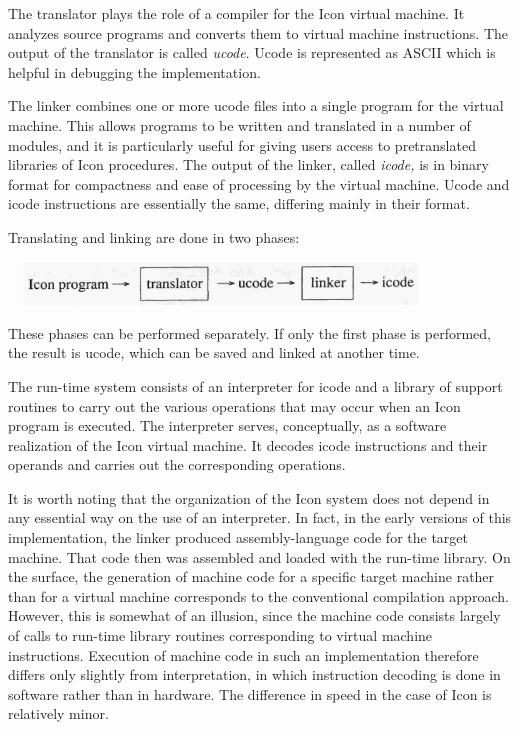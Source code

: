 The translator plays the role of a compiler for the Icon virtual
machine. It analyzes source programs and converts them to virtual
machine instructions. The output of the translator is called
\textit{ucode}. Ucode is represented as ASCII which is helpful in
debugging the implementation.

The linker combines one or more ucode files into a single program for
the virtual machine. This allows programs to be written and translated
in a number of modules, and it is particularly useful for giving users
access to pretranslated libraries of Icon procedures. The output of
the linker, called \textit{icode, }is in binary format for compactness
and ease of processing by the virtual machine. Ucode and icode
instructions are essentially the same, differing mainly in their
format.

Translating and linking are done in two phases:

\ \  \includegraphics[width=4.1681in,height=0.4543in]{ib-img/ib-img004.jpg} 


These phases can be performed separately. If only the first phase is
performed, the result is ucode, which can be saved and linked at
another time.

The run-time system consists of an interpreter for icode and a library
of support routines to carry out the various operations that may occur
when an Icon program is executed. The interpreter serves,
conceptually, as a software realization of the Icon virtual
machine. It decodes icode instructions and their operands and carries
out the corresponding operations.

It is worth noting that the organization of the Icon system does not
depend in any essential way on the use of an interpreter. In fact, in
the early versions of this implementation, the linker produced
assembly-language code for the target machine. That code then was
assembled and loaded with the run-time library. On the surface, the
generation of machine code for a specific target machine rather than
for a virtual machine corresponds to the conventional compilation
approach. However, this is somewhat of an illusion, since the machine
code consists largely of calls to run-time library routines
corresponding to virtual machine instructions. Execution of machine
code in such an implementation therefore differs only slightly from
interpretation, in which instruction decoding is done in software
rather than in hardware. The difference in speed in the case of Icon
is relatively minor.


